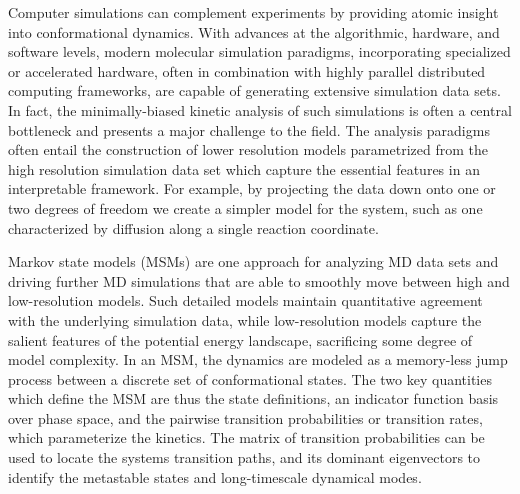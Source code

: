 \documentclass[twocolumn,floatfix,nofootinbib,aps]{revtex4-1}
\begin{document}
Computer simulations can complement experiments by providing atomic insight into conformational dynamics. With advances at the algorithmic, hardware, and software levels, modern molecular simulation paradigms, incorporating specialized or accelerated hardware, often in combination with highly parallel distributed computing frameworks, are capable of generating extensive simulation data sets\cite{Eastman2013OpenMM, Shirts2000Screen, Shaw2009Millisecond, Hess2008PLINCS, Buch2010High}. In fact, the minimally-biased kinetic analysis of such simulations is often a central bottleneck and presents a major challenge to the field. The analysis paradigms often entail the construction of lower resolution models parametrized from the high resolution simulation data set which capture the essential features in an interpretable framework\cite{Freddolino2010Challenges, Lane2013Milliseconds}. For example, by projecting the data down onto one or two degrees of freedom we create a simpler model for the system, such as one characterized by diffusion along a single reaction coordinate\cite{Best2010Coordinate}.

Markov state models (MSMs) are one approach for analyzing MD data sets and driving further MD simulations that are able to smoothly move between high and low-resolution models\cite{Pande2010Everything, Beauchamp2012Simple, Prinz2011Markov, Bowman2013Quantitative}. Such detailed models maintain quantitative agreement with the underlying simulation data, while low-resolution models capture the salient features of the potential energy landscape, sacrificing some degree of model complexity. In an MSM, the dynamics are modeled as a memory-less jump process between a discrete set of conformational states. The two key quantities which define the MSM are thus the state definitions, an indicator function basis over phase space, and the pairwise transition probabilities or transition rates, which parameterize the kinetics. The matrix of transition probabilities can be used to locate the systems transition paths\cite{Weinan2006Towards}, and its dominant eigenvectors to identify the metastable states\cite{Deuflhard2000Identification} and long-timescale dynamical modes\cite{}. 
\end{document}
